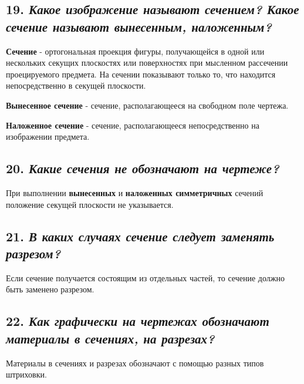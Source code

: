 \subsection*{19. \textit{Какое изображение называют сечением? Какое сечение называют вынесенным, наложенным?}}

\textbf{Сечение} - ортогональная проекция фигуры, получающейся в одной или нескольких секущих плоскостях или поверхностях при мысленном рассечении проецируемого предмета. На сечении показывают только то, что находится непосредственно в секущей плоскости.

\textbf{Вынесенное сечение} - сечение, располагающееся на свободном поле чертежа.

\textbf{Наложенное сечение} - сечение, располагающееся непосредственно на изображении предмета.



\subsection*{20. \textit{Какие сечения не обозначают на чертеже?}}

При выполнении \textbf{вынесенных} и \textbf{наложенных симметричных} сечений положение секущей плоскости не указывается.
\subsection*{21. \textit{В каких случаях сечение следует заменять разрезом?}}

Если сечение получается состоящим из отдельных частей, то сечение должно быть заменено разрезом.



\subsection*{22. \textit{Как графически на чертежах обозначают материалы в сечениях, на разрезах?}}

Материалы в сечениях и разрезах обозначают с помощью разных типов штриховки.


